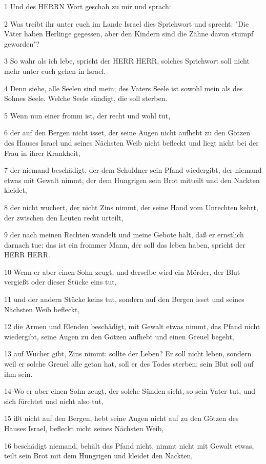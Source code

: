 \par 1 Und des HERRN Wort geschah zu mir und sprach:
\par 2 Was treibt ihr unter euch im Lande Israel dies Sprichwort und sprecht: "Die Väter haben Herlinge gegessen, aber den Kindern sind die Zähne davon stumpf geworden"?
\par 3 So wahr als ich lebe, spricht der HERR HERR, solches Sprichwort soll nicht mehr unter euch gehen in Israel.
\par 4 Denn siehe, alle Seelen sind mein; des Vaters Seele ist sowohl mein als des Sohnes Seele. Welche Seele sündigt, die soll sterben.
\par 5 Wenn nun einer fromm ist, der recht und wohl tut,
\par 6 der auf den Bergen nicht isset, der seine Augen nicht aufhebt zu den Götzen des Hauses Israel und seines Nächsten Weib nicht befleckt und liegt nicht bei der Frau in ihrer Krankheit,
\par 7 der niemand beschädigt, der dem Schuldner sein Pfand wiedergibt, der niemand etwas mit Gewalt nimmt, der dem Hungrigen sein Brot mitteilt und den Nackten kleidet,
\par 8 der nicht wuchert, der nicht Zins nimmt, der seine Hand vom Unrechten kehrt, der zwischen den Leuten recht urteilt,
\par 9 der nach meinen Rechten wandelt und meine Gebote hält, daß er ernstlich darnach tue: das ist ein frommer Mann, der soll das leben haben, spricht der HERR HERR.
\par 10 Wenn er aber einen Sohn zeugt, und derselbe wird ein Mörder, der Blut vergießt oder dieser Stücke eins tut,
\par 11 und der andern Stücke keins tut, sondern auf den Bergen isset und seines Nächsten Weib befleckt,
\par 12 die Armen und Elenden beschädigt, mit Gewalt etwas nimmt, das Pfand nicht wiedergibt, seine Augen zu den Götzen aufhebt und einen Greuel begeht,
\par 13 auf Wucher gibt, Zins nimmt: sollte der Leben? Er soll nicht leben, sondern weil er solche Greuel alle getan hat, soll er des Todes sterben; sein Blut soll auf ihm sein.
\par 14 Wo er aber einen Sohn zeugt, der solche Sünden sieht, so sein Vater tut, und sich fürchtet und nicht also tut,
\par 15 ißt nicht auf den Bergen, hebt seine Augen nicht auf zu den Götzen des Hauses Israel, befleckt nicht seines Nächsten Weib,
\par 16 beschädigt niemand, behält das Pfand nicht, nimmt nicht mit Gewalt etwas, teilt sein Brot mit dem Hungrigen und kleidet den Nackten,
